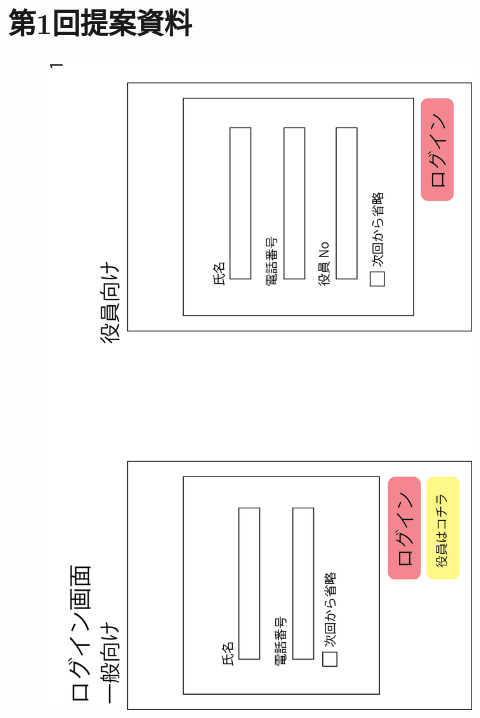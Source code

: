 \chapter{第1回提案資料}
\begin{figure}[ht]
    \begin{center}
      \includegraphics[keepaspectratio, scale=0.7]{appendixs/appendixA_figres/fig1.png}
    \end{center}
\end{figure}

